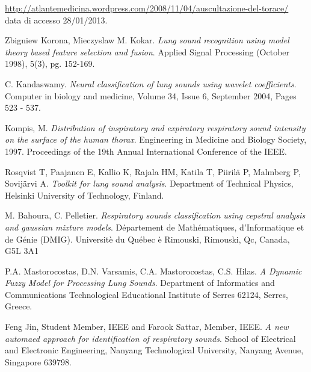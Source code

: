 \begin{thebibliography}{99}
  \url{http://atlantemedicina.wordpress.com/2008/11/04/auscultazione-del-torace/}\\
  data di accesso 28/01/2013.

  Zbigniew Korona, Mieczyslaw M. Kokar.
  \emph{Lung sound recognition using model theory based feature selection and fusion}.
  Applied Signal Processing (October 1998), 5(3), pg. 152-169. 
  


  C. Kandaswamy.
  \emph{Neural classification of lung sounds using wavelet coefficients}.
  Computer in biology and medicine,  Volume 34, Issue 6, September 2004, Pages 523 - 537.

  Kompis, M. 
  \emph{Distribution of inspiratory and expiratory respiratory sound intensity on the surface of the human thorax}.
  Engineering in Medicine and Biology Society, 1997. Proceedings of the 19th Annual International Conference of the IEEE.



  Rosqvist T, Paajanen E, Kallio K, Rajala HM, Katila T, Piiril\"{a} P, Malmberg P, Sovij\"{a}rvi A.
  \emph{Toolkit for lung sound analysis}.
  Department of Technical Physics, Helsinki University of Technology, Finland.

  M. Bahoura, C. Pelletier.
  \emph{Respiratory sounds classification using cepstral analysis and gaussian mixture models}.
  D\'epartement de Math\'ematiques, d'Informatique et de G\'enie (DMIG).
  Universit\`e du Qu\'ebec \`e Rimouski, Rimouski, Qc, Canada, G5L 3A1

  P.A. Mastorocostas, D.N. Varsamis, C.A. Mastorocostas, C.S. Hilas.
  \emph{A Dynamic Fuzzy Model for Processing Lung Sounds}.
  Department of Informatics and Communications Technological Educational Institute of Serres 62124, Serres, Greece.

  Feng Jin, Student Member, IEEE and Farook Sattar, Member, IEEE.
  \emph{A new automaed approach for identification of respiratory sounds}.
  School of Electrical and Electronic Engineering, Nanyang Technological University, Nanyang Avenue, Singapore 639798.


\end{thebibliography}
